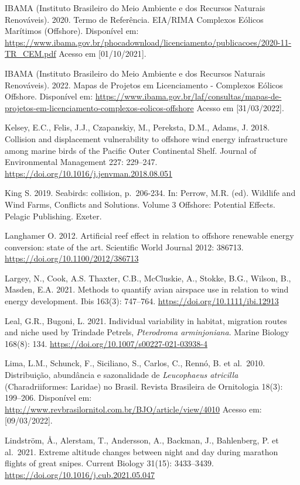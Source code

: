 \documentclass[
  oneside]{scrbook}
\begin{document}
IBAMA (Instituto Brasileiro do Meio Ambiente e dos Recursos Naturais Renováveis). 2020. Termo de Referência. EIA/RIMA Complexos Eólicos Marítimos (Offshore). Disponível em: \url{https://www.ibama.gov.br/phocadownload/licenciamento/publicacoes/2020-11-TR_CEM.pdf} Acesso em {[}01/10/2021{]}.

IBAMA (Instituto Brasileiro do Meio Ambiente e dos Recursos Naturais Renováveis). 2022. Mapas de Projetos em Licenciamento - Complexos Eólicos Offshore. Disponível em: \url{https://www.ibama.gov.br/laf/consultas/mapas-de-projetos-em-licenciamento-complexos-eolicos-offshore} Acesso em {[}31/03/2022{]}.

Kelsey, E.C., Felis, J.J., Czapanskiy, M., Pereksta, D.M., Adams, J. 2018. Collision and displacement vulnerability to offshore wind energy infrastructure among marine birds of the Pacific Outer Continental Shelf. Journal of Environmental Management 227: 229--247. \url{https://doi.org/10.1016/j.jenvman.2018.08.051}

King S. 2019. Seabirds: collision, p.~206-234. In: Perrow, M.R. (ed). Wildlife and Wind Farms, Conflicts and Solutions. Volume 3 Offshore: Potential Effects. Pelagic Publishing. Exeter.

Langhamer O. 2012. Artificial reef effect in relation to offshore renewable energy conversion: state of the art. Scientific World Journal 2012: 386713. \url{https://doi.org/10.1100/2012/386713}

Largey, N., Cook, A.S. Thaxter, C.B., McCluskie, A., Stokke, B.G., Wilson, B., Masden, E.A. 2021. Methods to quantify avian airspace use in relation to wind energy development. Ibis 163(3): 747--764. \url{https://doi.org/10.1111/ibi.12913}

Leal, G.R., Bugoni, L. 2021. Individual variability in habitat, migration routes and niche used by Trindade Petrels, \emph{Pterodroma arminjoniana}. Marine Biology 168(8): 134. \url{https://doi.org/10.1007/s00227-021-03938-4}

Lima, L.M., Schunck, F., Siciliano, S., Carlos, C., Rennó, B. et al.~2010. Distribuição, abundância e sazonalidade de \emph{Leucophaeus atricilla} (Charadriiformes: Laridae) no Brasil. Revista Brasileira de Ornitologia 18(3): 199--206. Disponível em: \url{http://www.revbrasilornitol.com.br/BJO/article/view/4010} Acesso em:{[}09/03/2022{]}.

Lindström, Å., Alerstam, T., Andersson, A., Backman, J., Bahlenberg, P. et al.~2021. Extreme altitude changes between night and day during marathon flights of great snipes. Current Biology 31(15): 3433--3439. \url{https://doi.org/10.1016/j.cub.2021.05.047}
\end{document}
